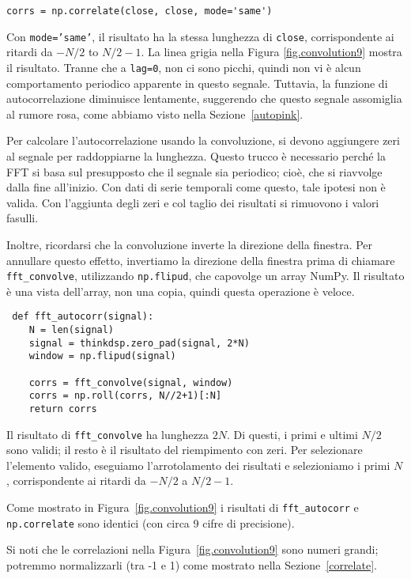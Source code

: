 \documentclass[12pt,a4paper]{book}
\begin{document}
\begin{verbatim} 
corrs = np.correlate(close, close, mode='same')
 \end{verbatim} 

Con {\tt mode='same'}, il risultato ha la stessa lunghezza di {\tt close}, corrispondente ai ritardi da $-N/2$ to $N/2-1$. La linea grigia nella Figura \ref{fig.convolution9} mostra il risultato. Tranne che a {\tt lag=0}, non ci sono picchi, quindi non vi è alcun comportamento periodico apparente in questo segnale. Tuttavia, la funzione di autocorrelazione diminuisce lentamente, suggerendo che questo segnale assomiglia al rumore rosa, come abbiamo visto nella Sezione~\ref{autopink}.

Per calcolare l'autocorrelazione usando la convoluzione, si devono aggiungere zeri al segnale per raddoppiarne la lunghezza. Questo trucco è necessario perché la FFT si basa sul presupposto che il segnale sia periodico; cioè, che si riavvolge dalla fine all'inizio. Con dati di serie temporali come questo, tale ipotesi non è valida. Con l'aggiunta degli zeri e col taglio dei risultati si rimuovono i valori fasulli.

Inoltre, ricordarsi che la convoluzione inverte la direzione della finestra. Per annullare questo effetto, invertiamo la direzione della finestra prima di chiamare \verb"fft_convolve", utilizzando {\tt np.flipud}, che capovolge un array NumPy. Il risultato è una vista dell'array, non una copia, quindi questa operazione è veloce.

\begin{verbatim} def fft_autocorr(signal):
    N = len(signal)
    signal = thinkdsp.zero_pad(signal, 2*N)
    window = np.flipud(signal)

    corrs = fft_convolve(signal, window)
    corrs = np.roll(corrs, N//2+1)[:N]
    return corrs
 \end{verbatim} 

Il risultato di \verb"fft_convolve" ha lunghezza $2N$. Di questi, i primi e ultimi $N/2$ sono validi; il resto è il risultato del riempimento con zeri. Per selezionare l'elemento valido, eseguiamo l'arrotolamento dei risultati e selezioniamo i primi $N$, corrispondente ai ritardi da $-N/2$ a $N/2-1$.

Come mostrato in Figura~\ref{fig.convolution9} i risultati di \verb"fft_autocorr" e {\tt np.correlate} sono identici (con circa 9 cifre di precisione).

Si noti che le correlazioni nella Figura~\ref{fig.convolution9} sono numeri grandi; potremmo normalizzarli (tra -1 e 1) come mostrato nella Sezione~\ref{correlate}.
\end{document}
